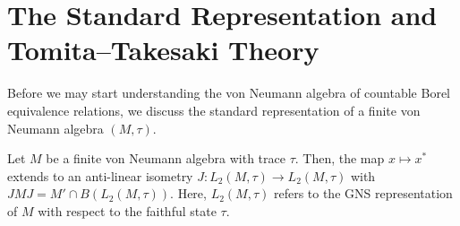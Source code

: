\documentclass[10pt]{mypackage}
\begin{document}
\RaggedRight
\section{The Standard Representation and Tomita--Takesaki Theory}%
Before we may start understanding the von Neumann algebra of countable Borel equivalence relations, we discuss the standard representation of a finite von Neumann algebra $\left( M,\tau \right)$.
\begin{proposition}
  Let $M$ be a finite von Neumann algebra with trace $\tau$. Then, the map $x\mapsto x^{\ast}$ extends to an anti-linear isometry $J\colon L_2\left( M,\tau \right)\rightarrow L_2\left( M,\tau \right)$ with $JMJ = M'\cap B\left( L_2\left( M,\tau \right) \right)$. Here, $L_2\left( M,\tau \right)$ refers to the GNS representation of $M$ with respect to the faithful state $\tau$.
\end{proposition}
\end{document}
